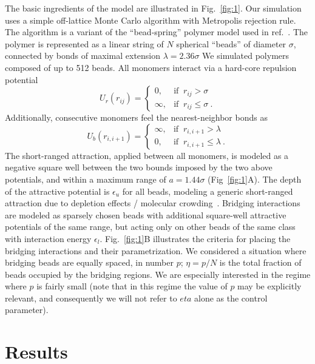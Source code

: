 \documentclass[
preprint,
a4paper,
12pt,
superscriptaddress,
pre]{revtex4}
\begin{document}
The basic ingredients of the model are illustrated in
Fig.~\ref{fig:1}. Our simulation uses a simple off-lattice Monte Carlo
algorithm with Metropolis rejection rule. The algorithm is a variant
of the ``bead-spring'' polymer model used in
ref.~\cite{Cacciuto2006}. The polymer is represented as a linear
string of $N$ spherical ``beads'' of diameter $\sigma$, connected by
bonds of maximal extension $\lambda = 2.36 \sigma$
We simulated polymers composed of up to 512 beads.  All monomers
interact via a hard-core repulsion potential
\begin{displaymath}
  U_r(r_{ij}) = \begin{cases} 
    0,  & \mbox{if }\ r_{ij} > \sigma \\ 
    \infty, & \mbox{if }\ r_{ij} \leq \sigma \ . 
  \end{cases} 
\end{displaymath}
Additionally, consecutive monomers feel the nearest-neighbor bonds as 
\begin{displaymath}
  U_b(r_{i,i+1}) = \begin{cases} 
    \infty,  & \mbox{if }\ r_{i,i+1} > \lambda \\ 
    0, & \mbox{if }\ r_{i,i+1} \leq \lambda \ . 
  \end{cases} 
\end{displaymath}
The short-ranged attraction, applied between all monomers, is modeled
as a negative square well between the two bounds imposed by the two
above potentials, and within a maximum range of $a = 1.44 \sigma$
(Fig~\ref{fig:1}A). The depth of the attractive potential is
$\epsilon_u$ for all beads, modeling a generic short-ranged attraction
due to depletion effects / molecular
crowding~\cite{Noro2000}. Bridging interactions are modeled as
sparsely chosen beads with additional square-well attractive
potentials of the same range, but acting only on other beads of the
same class with interaction energy $\epsilon_l$.
%
Fig.~\ref{fig:1}B illustrates the criteria for placing the bridging
interactions and their parametrization. We considered a situation
where bridging beads are equally spaced, in number $p$;  $\eta=p/N$ is
the total fraction of beads occupied by the bridging regions. We are
especially interested in the regime where $p$ is fairly small (note
that in this regime the value of $p$ may be explicitly relevant, and
consequently we will not refer to $eta$ alone as the control
parameter). 



\section{Results}
\end{document}
